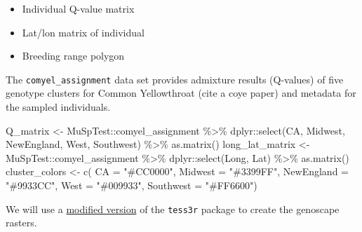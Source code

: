 \documentclass[
]{book}
\newenvironment{Shaded}{\begin{snugshade}}{\end{snugshade}}
\newcommand{\AttributeTok}[1]{\textcolor[rgb]{0.77,0.63,0.00}{#1}}
\newcommand{\FunctionTok}[1]{\textcolor[rgb]{0.00,0.00,0.00}{#1}}
\newcommand{\NormalTok}[1]{#1}
\newcommand{\OtherTok}[1]{\textcolor[rgb]{0.56,0.35,0.01}{#1}}
\newcommand{\SpecialCharTok}[1]{\textcolor[rgb]{0.00,0.00,0.00}{#1}}
\newcommand{\StringTok}[1]{\textcolor[rgb]{0.31,0.60,0.02}{#1}}
\providecommand{\tightlist}{%
  \setlength{\itemsep}{0pt}\setlength{\parskip}{0pt}}
\begin{document}
\begin{itemize}
\tightlist
\item
  Individual Q-value matrix
\item
  Lat/lon matrix of individual
\item
  Breeding range polygon
\end{itemize}

The \texttt{comyel\_assignment} data set provides admixture results (Q-values) of five genotype clusters for Common Yellowthroat (cite a coye paper) and metadata for the sampled individuals.

\begin{Shaded}
\begin{Highlighting}[]
\NormalTok{Q\_matrix }\OtherTok{\textless{}{-}}\NormalTok{ MuSpTest}\SpecialCharTok{::}\NormalTok{comyel\_assignment }\SpecialCharTok{\%\textgreater{}\%}
\NormalTok{  dplyr}\SpecialCharTok{::}\FunctionTok{select}\NormalTok{(CA, Midwest, NewEngland, West, Southwest) }\SpecialCharTok{\%\textgreater{}\%}
  \FunctionTok{as.matrix}\NormalTok{()}
\NormalTok{long\_lat\_matrix }\OtherTok{\textless{}{-}}\NormalTok{ MuSpTest}\SpecialCharTok{::}\NormalTok{comyel\_assignment }\SpecialCharTok{\%\textgreater{}\%}
\NormalTok{  dplyr}\SpecialCharTok{::}\FunctionTok{select}\NormalTok{(Long, Lat) }\SpecialCharTok{\%\textgreater{}\%}
  \FunctionTok{as.matrix}\NormalTok{()}
\NormalTok{cluster\_colors }\OtherTok{\textless{}{-}}  \FunctionTok{c}\NormalTok{(}
  \AttributeTok{CA =} \StringTok{"\#CC0000"}\NormalTok{,}
  \AttributeTok{Midwest =} \StringTok{"\#3399FF"}\NormalTok{,}
  \AttributeTok{NewEngland =} \StringTok{"\#9933CC"}\NormalTok{,}
  \AttributeTok{West =} \StringTok{"\#009933"}\NormalTok{,}
  \AttributeTok{Southwest =} \StringTok{"\#FF6600"}\NormalTok{) }
\end{Highlighting}
\end{Shaded}

We will use a \href{https://github.com/eriqande/TESS3_encho_sen}{modified version} of the \texttt{tess3r} package to create the genoscape rasters.
\end{document}
